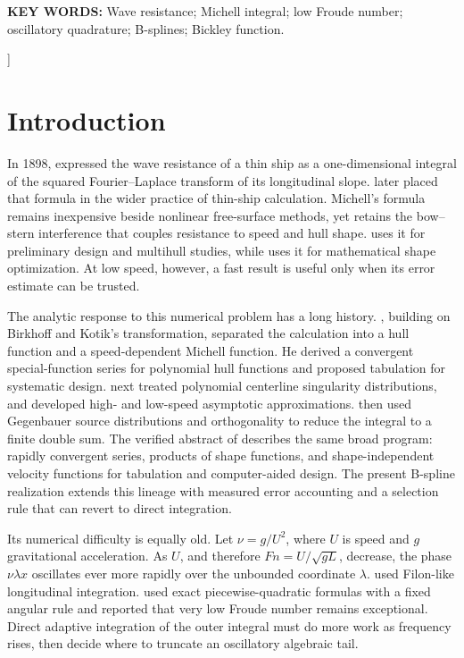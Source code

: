 \documentclass[10pt]{article}
\newcommand{\Fn}{\mathit{Fn}}
\begin{document}
\begin{@twocolumnfalse}
\noindent\textbf{KEY WORDS:} Wave resistance; Michell integral; low Froude
number; oscillatory quadrature; B-splines; Bickley function.
\vspace{1em}
\end{@twocolumnfalse}
]
\makeatother

\section{Introduction}

In 1898, \citet{Michell1898} expressed the wave resistance of a thin ship as a
one-dimensional integral of the squared Fourier--Laplace transform of its
longitudinal slope.  \citet{Tuck1989} later placed that formula in the wider
practice of thin-ship calculation.  Michell's formula remains inexpensive
beside nonlinear free-surface methods, yet retains the bow--stern interference
that couples resistance to speed and hull shape.  \citet{Lazauskas2009} uses
it for preliminary design and multihull studies, while
\citet{DambrinePierreRousseaux2016} uses it for mathematical shape
optimization.  At low speed, however, a fast result is useful only when its
error estimate can be trusted.

The analytic response to this numerical problem has a long history.
\citet{Michelsen1960}, building on Birkhoff and Kotik's transformation,
separated the calculation into a hull function and a speed-dependent Michell
function.  He derived a convergent special-function series for polynomial
hull functions and proposed tabulation for systematic design.
\citet{Michelsen1963} next treated polynomial centerline singularity
distributions, and \citet{Michelsen1966} developed high- and low-speed
asymptotic approximations.  \citet{Michelsen1972} then used Gegenbauer source
distributions and orthogonality to reduce the integral to a finite double sum.
The verified abstract of \citet{SendagortaGrases1988} describes the same broad
program: rapidly convergent series, products of shape functions, and
shape-independent velocity functions for tabulation and computer-aided
design.  The present B-spline realization extends this lineage with measured
error accounting and a selection rule that can revert to direct integration.

Its numerical difficulty is equally old.  Let \(\nu=g/U^2\), where \(U\) is
speed and \(g\) gravitational acceleration.  As \(U\), and therefore
\(\Fn=U/\sqrt{gL}\), decrease, the phase \(\nu\lambda x\) oscillates ever more
rapidly over the unbounded coordinate \(\lambda\).  \citet{Tuck1989} used
Filon-like longitudinal integration.  \citet{Lazauskas2009} used exact
piecewise-quadratic formulas with a fixed angular rule and reported that very
low Froude number remains exceptional.  Direct adaptive integration of the
outer integral must do more work as frequency rises, then decide where to
truncate an oscillatory algebraic tail.
\end{document}
